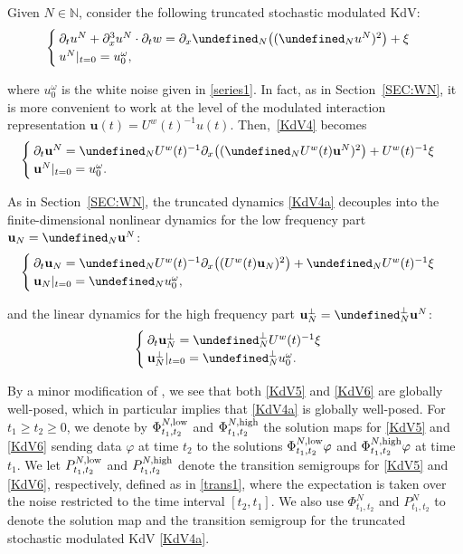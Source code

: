 \documentclass[letterpaper, 11pt,  reqno]{amsart}
\newcommand{\1}{\hspace{0.5mm}\text{I}\hspace{0.5mm}}
\newcommand{\noi}{\noindent}
\let\P= \undefined
\newcommand{\P}{\mathbf{P}}
\newcommand{\low}{\textup{low}}
\newcommand{\high}{\textup{high}}
\newcommand{\dx}{\partial_x}
\newcommand{\dt}{\partial_t}
\renewcommand{\o}{\omega}
\newcommand{\N}{\mathbb{N}}
\newcommand{\uw}{U^w}
\newcommand{\uu}{\mathbf{u}}
\numberwithin{equation}{section}
\numberwithin{theorem}{section}
\begin{document}
Given $N \in \N$, 
consider 
the following truncated stochastic modulated KdV:
\begin{equation}
\label{KdV4}
\begin{cases}
\dt u^N+  \dx^3 u^N \cdot \dt w =\dx \P_N\big((\P_Nu^N)^2\big) +  \xi\\
u^N|_{t = 0} = u_0^\o, 
\end{cases}
\end{equation}

\noi
where $u_0^\o$ is the white noise given in \eqref{series1}.
In fact,
as in Section~\ref{SEC:WN}, 
 it is more convenient to work at the level of the modulated interaction representation
 $\uu(t) = \uw(t)^{-1} u(t)$.
Then,~\eqref{KdV4} becomes
\begin{equation}
\label{KdV4a}
\begin{cases}
\dt \uu^N = \P_N\uw(t)^{-1} \dx\big( (\P_N \uw(t) \uu^N)^2\big) +  \uw(t)^{-1} \xi\\
\uu^N|_{t = 0} = u_0^\o.
\end{cases}
\end{equation}


\noi
As in Section~\ref{SEC:WN}, the truncated dynamics \eqref{KdV4a}
 decouples into 
 the finite-dimensional nonlinear dynamics for the low frequency part 
 $\uu_N = \P_{N} \uu^N$:
\begin{align}
\begin{cases}
\dt \uu_N = \P_N\uw(t)^{-1} \dx\big( ( \uw(t) \uu_N)^2\big)
+ \P_N  \uw(t)^{-1} \xi\\
\uu_N|_{t = 0} = \P_{N} u_0^\o, 
\end{cases}
\label{KdV5}
\end{align}


\noi
and the linear dynamics for the high frequency part 
$\uu_N^\perp = \P_N^\perp \uu^N$:
\begin{align}
\begin{cases}
\dt \uu_N^\perp =  \P_N^\perp  \uw(t)^{-1} \xi \\
\uu_N^\perp |_{t = 0} = \P_{N}^\perp u_0^\o.
\end{cases}
\label{KdV6}
\end{align}



\noi
By a minor modification of \cite[Lemma 2.1]{OQS}, 
we see  that both \eqref{KdV5} and \eqref{KdV6}
are globally well-posed, 
 which in particular implies that \eqref{KdV4a} is globally well-posed.
For $t_1 \ge t_2 \ge 0$,
we denote by 
 $\Phi^{N, \low}_{t_1, t_2}$
 and $\Phi^{N, \high}_{t_1, t_2}$  
 the solution maps for \eqref{KdV5} and \eqref{KdV6}
sending data $\varphi$  at time $t_2$ to the solutions 
$\Phi^{N, \low}_{t_1, t_2}\varphi$
and $\Phi^{N, \high}_{t_1, t_2}\varphi$ at time $t_1$.
We let $P^{N,\low}_{t_1, t_2}$
and $P^{N,\high}_{t_1, t_2}$ denote the transition semigroups
for \eqref{KdV5} and \eqref{KdV6}, respectively, 
defined as in \eqref{trans1}, where the expectation 
is taken over the noise restricted to the time interval $[t_2, t_1]$.
We also use 
$\Phi^{N}_{t_1, t_2}$
and $P^{N}_{t_1, t_2}$
to denote the solution map and the transition semigroup for the truncated
stochastic modulated KdV \eqref{KdV4a}.
\end{document}
